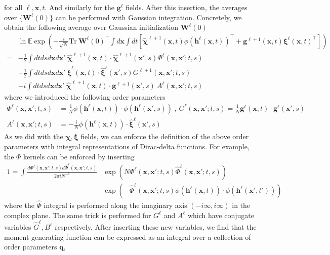 \documentclass{article} %
\def\h{\bm h}
\def\x{\bm x}
\def\g{\bm g}
\def\W{\bm W}
\begin{document}
for all $\ell,\x,t$. And similarly for the $\g^\ell$ fields. After this insertion, the averages over $\{\W^\ell(0)\}$ can be performed with Gaussian integration. Concretely, we obtain the following average over Gaussian initialization $\W^\ell(0)$
\begin{align}
    &\ln \mathbb{E}\exp\left( - \frac{i}{\sqrt N} \text{Tr} \ \W^\ell(0)^\top  \int d\x \int dt \left[ \bm{\hat\chi}^{\ell+1}(\x,t) \phi(\h^\ell(\x,t))^\top + \g^{\ell+1}(\x,t) \bm\xi^\ell(\x,t)^\top  \right]  \right) \nonumber
    \\
    =& -\frac{1}{2} \int dt ds  d\x d\x' \ \bm{\hat \chi}^{\ell+1}(\x,t) \cdot \bm{\hat \chi}^{\ell+1}(\x',s) \Phi^{\ell}(\x,\x';t,s) \nonumber
    \\
    &- \frac{1}{2} \int dt ds  d\x d\x' \ \bm{\hat \xi}^\ell(\x,t) \cdot \bm{\hat \xi}^\ell(\x',s) G^{\ell+1}(\x,\x';t,s) \nonumber
    \\
    &- i \int dt ds  d\x d\x' \ \bm{\hat \chi}^{\ell+1}(\x,t) \cdot \g^{\ell+1}(\x',s) \ A^{\ell}(\x,\x';t,s)
\end{align}
where we introduced the following order parameters
\begin{align}
    \Phi^{\ell}(\x,\x';t,s) &= \frac{1}{N} \phi(\h^\ell(\x,t)) \cdot \phi(\h^\ell(\x',s))  \ , \ G^{\ell}(\x,\x';t,s) = \frac{1}{N} \g^\ell(\x,t) \cdot \g^\ell(\x',s) 
    \\
     A^{\ell}(\x,\x';t,s) &= - \frac{i}{N} \phi(\h^\ell(\x,t)) \cdot \bm{\hat\xi}^\ell(\x',s)
\end{align}
As we did with the $\bm\chi,\bm\xi$ fields, we can enforce the definition of the above order parameters with integral representations of Dirac-delta functions. For example, the $\Phi$ kernels can be enforced by inserting 
\begin{align}
    1 = \int \frac{d \Phi^{\ell}(\x,\x';t,s) d \hat \Phi^{\ell}(\x,\x';t,s)}{2\pi i N^{-1}} &\exp\left( N \Phi^{\ell}(\x,\x';t,s) \hat \Phi^{\ell}(\x,\x';t,s) \right) \nonumber
    \\
    &\exp\left( - \hat \Phi^{\ell}(\x,\x';t,s)  \phi(\h^\ell(\x,t)) \cdot \phi(\h^\ell(\x',t')) \right)
\end{align}
where the $\hat\Phi$ integral is performed along the imaginary axis $(-i \infty, i\infty)$ in the complex plane. The same trick is performed for $G^\ell$ and $A^\ell$ which have conjugate variables $\hat G^\ell, B^\ell$ respectively. After inserting these new variables, we find that the moment generating function can be expressed as an integral over a collection of order parameters $\bm q$,
\end{document}
